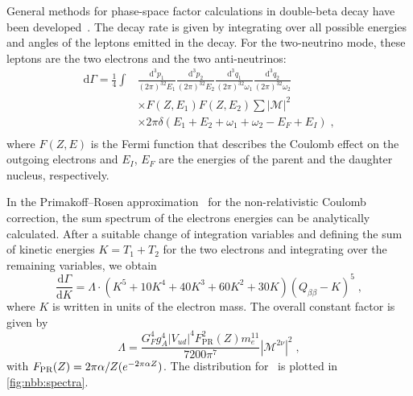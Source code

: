 General methods for phase-space factor calculations in double-beta decay have
been developed~\cite{Doi1981,Doi1983,Tomoda1991}. The decay rate is given by
integrating over all possible energies and angles of the leptons emitted in the
decay. For the two-neutrino mode, these leptons are the two electrons and the
two anti-neutrinos:
\begin{equation}
  \begin{split}
    \text{d}\Gamma = \frac{1}{4} \int & \frac{\text{d}^3p_1}{(2\pi)^32E_1}
                                        \frac{\text{d}^3p_2}{(2\pi)^32E_2}
                                        \frac{\text{d}^3q_1}{(2\pi)^32\omega_1}
                                        \frac{\text{d}^3q_2}{(2\pi)^32\omega_2} \\
                                      & \times F(Z,E_1) F(Z,E_2) \sum |\mathcal{M}|^2 \\
                                      & \times 2\pi\delta (E_1 + E_2 + \omega_1 +
                                        \omega_2 - E_F + E_I) \;, \\
  \end{split}
\end{equation}
where $F(Z,E)$ is the Fermi function that describes the Coulomb effect on the
outgoing electrons and $E_I$, $E_F$ are the energies of the parent and the
daughter nucleus, respectively.

In the Primakoff–Rosen approximation~\cite{Primakoff1959} for the
non-relativistic Coulomb correction, the sum spectrum of the electrons energies
can be analytically calculated. After a suitable change of integration
variables and defining the sum of kinetic energies $K=T_1+T_2$ for the two
electrons and integrating over the remaining variables, we obtain
\begin{equation}\label{eq:nbb:stdmodel}
  \frac{\text{d}\Gamma}{\text{d}K} = \Lambda \cdot (K^5+10K^4+40K^3+60K^2+30K)
                                     (Q_{\beta\beta}-K)^5 \;,
\end{equation}
where $K$ is written in units of the electron mass. The overall constant factor
is given by
\begin{equation}
  \Lambda = \frac{G_F^4g_A^4|V_{ud}|^4F^2_\text{PR}(Z)m_e^{11}}{7200\pi^7}
            |\mathcal{M}^{2\nu}|^2 \;,
\end{equation}
with $F_\text{PR}(Z) = 2\pi\alpha/Z(\-e^{-2\pi\alpha Z})$. The distribution for
\gesix\ is plotted in \cref{fig:nbb:spectra}.

